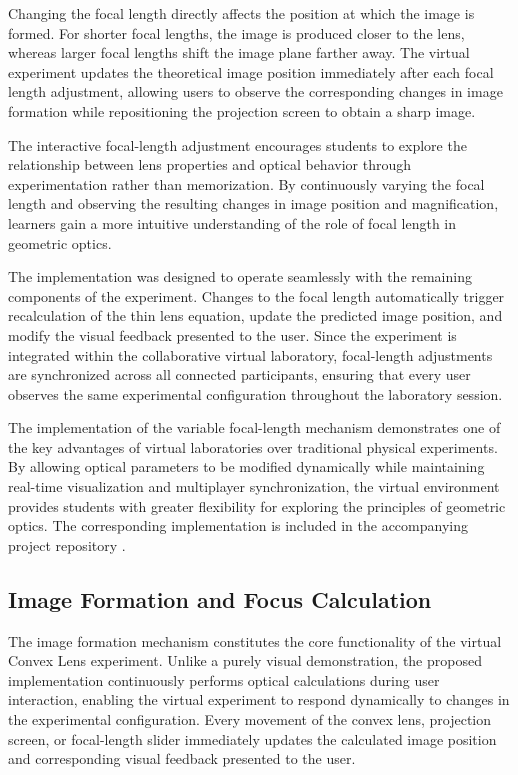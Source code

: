 Changing the focal length directly affects the position at which the image is formed. For shorter focal lengths, the image is produced closer to the lens, whereas larger focal lengths shift the image plane farther away. The virtual experiment updates the theoretical image position immediately after each focal length adjustment, allowing users to observe the corresponding changes in image formation while repositioning the projection screen to obtain a sharp image.

The interactive focal-length adjustment encourages students to explore the relationship between lens properties and optical behavior through experimentation rather than memorization. By continuously varying the focal length and observing the resulting changes in image position and magnification, learners gain a more intuitive understanding of the role of focal length in geometric optics.

The implementation was designed to operate seamlessly with the remaining components of the experiment. Changes to the focal length automatically trigger recalculation of the thin lens equation, update the predicted image position, and modify the visual feedback presented to the user. Since the experiment is integrated within the collaborative virtual laboratory, focal-length adjustments are synchronized across all connected participants, ensuring that every user observes the same experimental configuration throughout the laboratory session.

The implementation of the variable focal-length mechanism demonstrates one of the key advantages of virtual laboratories over traditional physical experiments. By allowing optical parameters to be modified dynamically while maintaining real-time visualization and multiplayer synchronization, the virtual environment provides students with greater flexibility for exploring the principles of geometric optics. The corresponding implementation is included in the accompanying project repository \cite{thesisRepo}.

\subsection{Image Formation and Focus Calculation}

The image formation mechanism constitutes the core functionality of the virtual Convex Lens experiment. Unlike a purely visual demonstration, the proposed implementation continuously performs optical calculations during user interaction, enabling the virtual experiment to respond dynamically to changes in the experimental configuration. Every movement of the convex lens, projection screen, or focal-length slider immediately updates the calculated image position and corresponding visual feedback presented to the user.

